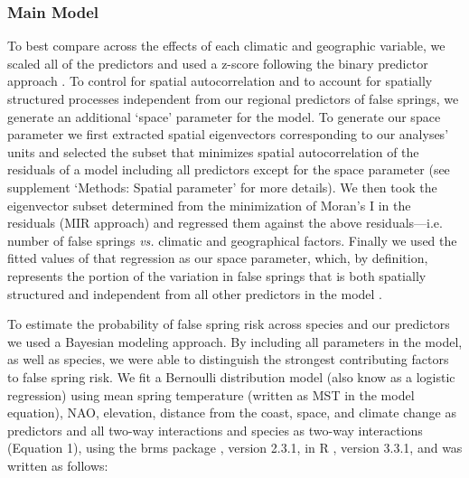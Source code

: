 \documentclass{article}\usepackage[]{graphicx}\usepackage[]{color}
\begin{document}
\subsubsection*{Main Model}
To best compare across the effects of each climatic and geographic variable, we scaled all of the predictors and used a z-score following the binary predictor approach \citep{Gelman2006}. To control for spatial autocorrelation and to account for spatially structured processes independent from our regional predictors of false springs, we generate an additional `space' parameter for the model. To generate our space parameter we first extracted spatial eigenvectors corresponding to our analyses' units and selected the subset that minimizes spatial autocorrelation of the residuals of a model including all predictors except for the space parameter \citep{diniz2012selection,Baumen2017} (see supplement `Methods: Spatial parameter' for more details). We then took the eigenvector subset determined from the minimization of Moran's I in the residuals (MIR approach) and regressed them against the above residuals---i.e. number of false springs \emph{vs.} climatic and geographical factors. Finally we used the fitted values of that regression as our space parameter, which, by definition, represents the portion of the variation in false springs that is both spatially structured and independent from all other predictors in the model \citep[e.g. average spring temperature, elevation, etc.][]{griffith2006spatial,morales2012imprint}. 

To estimate the probability of false spring risk across species and our predictors we used a Bayesian modeling approach. By including all parameters in the model, as well as species, we were able to distinguish the strongest contributing factors to false spring risk. We fit a Bernoulli distribution model (also know as a logistic regression) using mean spring temperature (written as MST in the model equation), NAO, elevation, distance from the coast, space, and climate change as predictors and all two-way interactions and species as two-way interactions (Equation 1), using the brms package \citep{brms}, version 2.3.1,  in R \citep{R}, version 3.3.1, and was written as follows:
\end{document}
